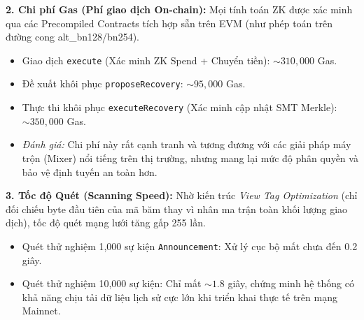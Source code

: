 \documentclass[../DoAn.tex]{subfiles}
\begin{document}
\textbf{2. Chi phí Gas (Phí giao dịch On-chain):}
Mọi tính toán ZK được xác minh qua các Precompiled Contracts tích hợp sẵn trên EVM (như phép toán trên đường cong alt\_bn128/bn254).
\begin{itemize}
    \item Giao dịch \texttt{execute} (Xác minh ZK Spend + Chuyển tiền): $\sim 310,000$ Gas.
    \item Đề xuất khôi phục \texttt{proposeRecovery}: $\sim 95,000$ Gas.
    \item Thực thi khôi phục \texttt{executeRecovery} (Xác minh cập nhật SMT Merkle): $\sim 350,000$ Gas.
    \item \textit{Đánh giá:} Chi phí này rất cạnh tranh và tương đương với các giải pháp máy trộn (Mixer) nổi tiếng trên thị trường, nhưng mang lại mức độ phân quyền và bảo vệ định tuyến an toàn hơn.
\end{itemize}

\textbf{3. Tốc độ Quét (Scanning Speed):}
Nhờ kiến trúc \textit{View Tag Optimization} (chỉ đối chiếu byte đầu tiên của mã băm thay vì nhân ma trận toàn khối lượng giao dịch), tốc độ quét mạng lưới tăng gấp 255 lần.
\begin{itemize}
    \item Quét thử nghiệm 1,000 sự kiện \texttt{Announcement}: Xử lý cục bộ mất chưa đến 0.2 giây.
    \item Quét thử nghiệm 10,000 sự kiện: Chỉ mất $\sim 1.8$ giây, chứng minh hệ thống có khả năng chịu tải dữ liệu lịch sử cực lớn khi triển khai thực tế trên mạng Mainnet.
\end{itemize}
\end{document}
